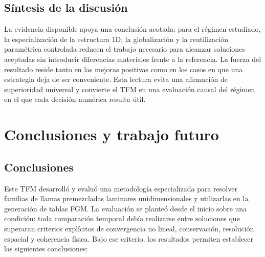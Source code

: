 \documentclass[12pt,a4paper,twoside,openany]{book}
\begin{document}
\section{Síntesis de la discusión}

La evidencia disponible apoya una conclusión acotada: para el régimen estudiado,
la especialización de la estructura 1D, la globalización y la reutilización
paramétrica controlada reducen el trabajo necesario para alcanzar soluciones
aceptadas sin introducir diferencias materiales frente a la referencia. La
fuerza del resultado reside tanto en las mejoras positivas como en los casos en
que una estrategia deja de ser conveniente. Esta lectura evita una afirmación de
superioridad universal y convierte el TFM en una evaluación causal del régimen
en el que cada decisión numérica resulta útil.

\chapter{Conclusiones y trabajo futuro}
\label{chap:conclusiones}

\section{Conclusiones}

Este TFM desarrolló y evaluó una metodología especializada para resolver
familias de llamas premezcladas laminares unidimensionales y utilizarlas en la
generación de tablas FGM. La evaluación se planteó desde el inicio sobre una
condición: toda comparación temporal debía realizarse entre soluciones que
superaran criterios explícitos de convergencia no lineal, conservación,
resolución espacial y coherencia física. Bajo ese criterio, los resultados
permiten establecer las siguientes conclusiones:
\end{document}
